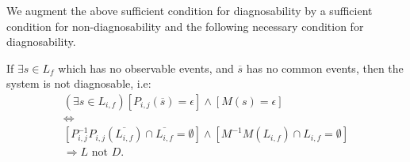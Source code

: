\documentclass[a4paper, 10pt, conference]{ieeeconf} \IEEEoverridecommandlockouts
\begin{document}
% 


We augment the above sufficient condition for diagnosability by a sufficient
condition for non-diagnosability and the following necessary condition for
diagnosability.
 \begin{conjecture}
If $\exists s \in L_f$ which has no observable events, and $\overline{s}$ has no
common events, then the system is not diagnosable, i.e:
\begin{equation}
\begin{array}{l}
	(\exists s \in L_{i,f}) 
	\left[
		P_{i,j}(\overline{s}) = \epsilon
	\right]
		\land
	\left[
		M(s) = \epsilon
	\right]
	\\[1ex]
	\Leftrightarrow
	\\[1ex]
	\left[
		P^{-1}_{i,j}P_{i,j}(\overline{L_{i,f}})\cap \overline{L_{i,f}} = \emptyset
	\right]
		\land
	\left[
		M^{-1}M(L_{i,f})\cap L_{i,f} = \emptyset
	\right]
	\\[2ex]
	\Rightarrow L \textrm{ not }D.
\end{array}
\end{equation}
\end{conjecture}
\end{document}
